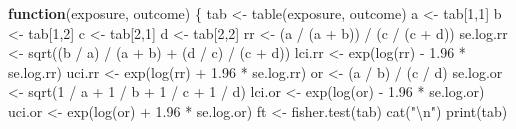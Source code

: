 \documentclass[
  12pt,
]{book}
\newenvironment{Shaded}{\begin{snugshade}}{\end{snugshade}}
\newcommand{\ControlFlowTok}[1]{\textcolor[rgb]{0.13,0.29,0.53}{\textbf{#1}}}
\newcommand{\DecValTok}[1]{\textcolor[rgb]{0.00,0.00,0.81}{#1}}
\newcommand{\FloatTok}[1]{\textcolor[rgb]{0.00,0.00,0.81}{#1}}
\newcommand{\FunctionTok}[1]{\textcolor[rgb]{0.00,0.00,0.00}{#1}}
\newcommand{\NormalTok}[1]{#1}
\newcommand{\OtherTok}[1]{\textcolor[rgb]{0.56,0.35,0.01}{#1}}
\newcommand{\SpecialCharTok}[1]{\textcolor[rgb]{0.00,0.00,0.00}{#1}}
\newcommand{\StringTok}[1]{\textcolor[rgb]{0.31,0.60,0.02}{#1}}
\begin{document}
\begin{Shaded}
\begin{Highlighting}[]
\ControlFlowTok{function}\NormalTok{(exposure, outcome) \{}
\NormalTok{  tab }\OtherTok{\textless{}{-}} \FunctionTok{table}\NormalTok{(exposure, outcome)}
\NormalTok{  a }\OtherTok{\textless{}{-}}\NormalTok{ tab[}\DecValTok{1}\NormalTok{,}\DecValTok{1}\NormalTok{]}
\NormalTok{  b }\OtherTok{\textless{}{-}}\NormalTok{ tab[}\DecValTok{1}\NormalTok{,}\DecValTok{2}\NormalTok{]}
\NormalTok{  c }\OtherTok{\textless{}{-}}\NormalTok{ tab[}\DecValTok{2}\NormalTok{,}\DecValTok{1}\NormalTok{]}
\NormalTok{  d }\OtherTok{\textless{}{-}}\NormalTok{ tab[}\DecValTok{2}\NormalTok{,}\DecValTok{2}\NormalTok{]}
\NormalTok{  rr }\OtherTok{\textless{}{-}}\NormalTok{ (a }\SpecialCharTok{/}\NormalTok{ (a }\SpecialCharTok{+}\NormalTok{ b)) }\SpecialCharTok{/}\NormalTok{ (c }\SpecialCharTok{/}\NormalTok{ (c }\SpecialCharTok{+}\NormalTok{ d))}
\NormalTok{  se.log.rr }\OtherTok{\textless{}{-}} \FunctionTok{sqrt}\NormalTok{((b }\SpecialCharTok{/}\NormalTok{ a) }\SpecialCharTok{/}\NormalTok{ (a }\SpecialCharTok{+}\NormalTok{ b) }\SpecialCharTok{+}\NormalTok{ (d }\SpecialCharTok{/}\NormalTok{ c) }\SpecialCharTok{/}\NormalTok{ (c }\SpecialCharTok{+}\NormalTok{ d)) }
\NormalTok{  lci.rr }\OtherTok{\textless{}{-}} \FunctionTok{exp}\NormalTok{(}\FunctionTok{log}\NormalTok{(rr) }\SpecialCharTok{{-}} \FloatTok{1.96} \SpecialCharTok{*}\NormalTok{ se.log.rr)}
\NormalTok{  uci.rr }\OtherTok{\textless{}{-}} \FunctionTok{exp}\NormalTok{(}\FunctionTok{log}\NormalTok{(rr) }\SpecialCharTok{+} \FloatTok{1.96} \SpecialCharTok{*}\NormalTok{ se.log.rr)}
\NormalTok{  or }\OtherTok{\textless{}{-}}\NormalTok{ (a }\SpecialCharTok{/}\NormalTok{ b) }\SpecialCharTok{/}\NormalTok{ (c }\SpecialCharTok{/}\NormalTok{ d)}
\NormalTok{  se.log.or }\OtherTok{\textless{}{-}} \FunctionTok{sqrt}\NormalTok{(}\DecValTok{1} \SpecialCharTok{/}\NormalTok{ a }\SpecialCharTok{+} \DecValTok{1} \SpecialCharTok{/}\NormalTok{ b }\SpecialCharTok{+} \DecValTok{1} \SpecialCharTok{/}\NormalTok{ c }\SpecialCharTok{+} \DecValTok{1} \SpecialCharTok{/}\NormalTok{ d)}
\NormalTok{  lci.or }\OtherTok{\textless{}{-}} \FunctionTok{exp}\NormalTok{(}\FunctionTok{log}\NormalTok{(or) }\SpecialCharTok{{-}} \FloatTok{1.96} \SpecialCharTok{*}\NormalTok{ se.log.or)}
\NormalTok{  uci.or }\OtherTok{\textless{}{-}} \FunctionTok{exp}\NormalTok{(}\FunctionTok{log}\NormalTok{(or) }\SpecialCharTok{+} \FloatTok{1.96} \SpecialCharTok{*}\NormalTok{ se.log.or)}
\NormalTok{  ft }\OtherTok{\textless{}{-}} \FunctionTok{fisher.test}\NormalTok{(tab)}
  \FunctionTok{cat}\NormalTok{(}\StringTok{"}\SpecialCharTok{\textbackslash{}n}\StringTok{"}\NormalTok{)}
  \FunctionTok{print}\NormalTok{(tab)}
  

\end{Highlighting}
\end{Shaded}
\end{document}
